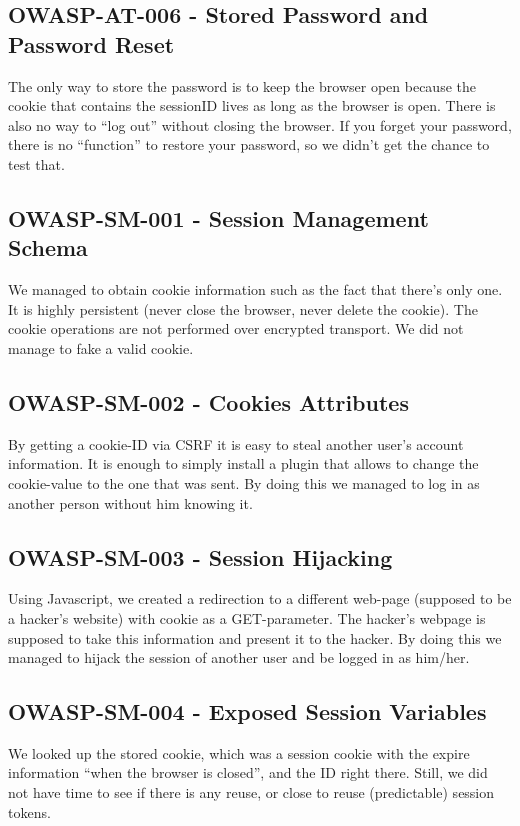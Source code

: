 \subsection{OWASP-AT-006 - Stored Password and Password Reset}
The only way to store the password is to keep the browser open because the cookie that contains the sessionID lives as long as the browser is open. There is also no way to “log out” without closing the browser. If you forget your password, there is no “function” to restore your password, so we didn’t get the chance to test that.

\subsection{OWASP-SM-001 - Session Management Schema}
We managed to obtain cookie information such as the fact that there’s only one. It is highly persistent (never close the browser, never delete the cookie). The cookie operations are not performed over encrypted transport. We did not manage to fake a valid cookie.

\subsection{OWASP-SM-002 - Cookies Attributes}
By getting a cookie-ID via CSRF it is easy to steal another user’s account information. It is enough to simply install a plugin that allows to change the cookie-value to the one that was sent. By doing this we managed to log in as another person without him knowing it.

\subsection{OWASP-SM-003 - Session Hijacking}
Using Javascript, we created a redirection to a different web-page (supposed to be a hacker’s website) with cookie as a GET-parameter. The hacker’s webpage is supposed to take this information and present it to the hacker. By doing this we managed to hijack the session of another user and be logged in as him/her.

\subsection{OWASP-SM-004 - Exposed Session Variables}
We looked up the stored cookie, which was a session cookie with the expire information “when the browser is closed”, and the ID right there. Still, we did not have time to see if there is any reuse, or close to reuse (predictable) session tokens.

